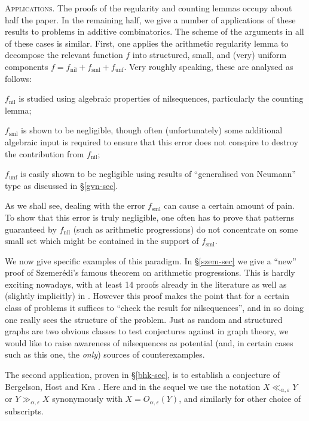 \documentclass[11pt,reqno]{amsart}
\numberwithin{equation}{section}
\theoremstyle{plain}
\theoremstyle{definition}
\newcommand\1{{\bf 1}}
\newcommand\2{{\bf 2}}
\newcommand\eps{\varepsilon}
\newcommand\nil{{\operatorname{nil}}}
\newcommand\sml{{\operatorname{sml}}}
\newcommand\unf{{\operatorname{unf}}}
\begin{document}
\textsc{Applications.} The proofs of the regularity and counting lemmas occupy about half the paper. In the remaining half, we give a number of applications of these results to problems in additive combinatorics.  The scheme of the arguments in all of these cases is similar.  First, one applies the arithmetic regularity lemma to decompose the relevant function $f$ into structured, small, and (very) uniform components $f = f_\nil + f_\sml + f_\unf$. Very roughly speaking, these are analysed as follows:

$f_\nil$ is studied using algebraic properties of nilsequences, particularly the counting lemma;

$f_\sml$ is shown to be negligible, though often (unfortunately) some additional algebraic input is required to ensure that this error does not conspire to destroy the contribution from $f_\nil$;

$f_\unf$ is easily shown to be negligible using results of ``generalised von Neumann'' type as discussed in \S \ref{gvn-sec}.

As we shall see, dealing with the error $f_\sml$ can cause a certain amount of pain. To show that this error is truly negligible, one often has to prove that patterns guaranteed by $f_\nil$ (such as arithmetic progressions) do not concentrate on some small set which might be contained in the support of $f_\sml$.

We now give specific examples of this paradigm.  In \S \ref{szem-sec} we give a ``new'' proof of Szemer\'edi's famous theorem on arithmetic progressions. This is hardly exciting nowadays, with at least 14 proofs already in the literature \cite{austin-multdimsz, austin-dhj,furstenberg-book,fko, gowers-longaps,gowers-hypergraph,nagle-rodl-schacht,polymath,szemeredi-aps,tao-quant-ergodic,tao-hypergraph} as well as (slightly implicitly) in \cite{bergelson-host-kra,host-kra,ziegler}. However this proof makes the point that for a certain class of problems it suffices to ``check the result for nilsequences'', and in so doing one really sees the structure of the problem. Just as random and structured graphs are two obvious classes to test conjectures against in graph theory, we would like to raise awareness of nilsequences as potential (and, in certain cases such as this one, the \emph{only}) sources of counterexamples.

The second application, proven in \S \ref{bhk-sec}, is to establish a conjecture of Bergelson, Host and Kra \cite{bergelson-host-kra}. Here and in the sequel we use the notation $X \ll_{\alpha,\eps} Y$ or $Y \gg_{\alpha,\eps} X$ synonymously with $X = O_{\alpha,\eps}(Y)$, and similarly for other choice of subscripts.
\end{document}
